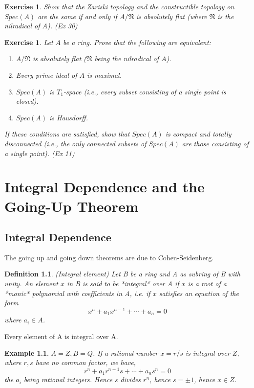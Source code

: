 \documentclass[]{report}
\newtheorem{defn}[theorem]{Definition}
\newtheorem{examples}[theorem]{Example}
\newtheorem{exercise}[theorem]{Exercise}
\begin{document}
\begin{exercise}
    Show that the Zariski topology and the constructible topology on $Spec(A)$ are the same if and only if $A/\mathfrak{N}$ is absolutely flat (where $\mathfrak{N}$ is the nilradical of $A$). 
    (Ex 30)
\end{exercise}

\begin{exercise}
    Let $A$ be a ring. Prove that the following are equivalent:
    \begin{enumerate}
        \item $A/\mathfrak{N}$ is absolutely flat ($\mathfrak{N}$ being the nilradical of $A$).
        \item Every prime ideal of $A$ is maximal.
        \item $Spec(A)$ is $T_1$-space (i.e., every subset consisting of a single point is closed).
        \item $Spec(A)$ is Hausdorff.
    \end{enumerate}
    If these conditions are satisfied, show that $Spec(A)$ is compact and totally disconnected (i.e., the only connected subsets of $Spec(A)$ are those consisting of a single point). 
    (Ex 11)
\end{exercise}




\chapter{Integral Dependence and the Going-Up Theorem}

\section{Integral Dependence}

The going up and going down theorems are due to Cohen-Seidenberg.

\begin{defn} 
    (Integral element) Let B be a ring and A as subring of B with unity. An element $x$ in B is said to be *integral* over A if $x$ is a root of a *monic* polynomial with coefficients in A, i.e. if $x$ satisfies an equation of the form
$$x^n + a_1x^{n-1} + \cdots + a_n = 0$$
where $a_i\in A$. 
\end{defn}

Every element of A is integral over A.

\begin{examples} 
    $A = Z, B = Q$. If a rational number $x=r/s$ is integral over $Z$, where $r,s$ have no common factor, we have,
$$r^n + a_1r^{n-1}s + \cdots + a_ns^n = 0$$
the $a_i$ being rational integers. Hence $s$ divides $r^n$, hence $s=\pm 1$, hence $x\in Z$.
\end{examples}
\end{document}
